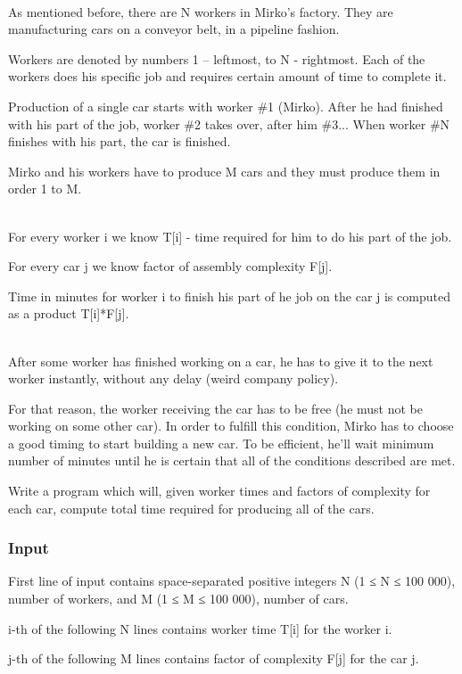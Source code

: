 

 

As mentioned before, there are N workers in Mirko's factory. They are manufacturing cars on a conveyor belt, in a pipeline fashion.

Workers are denoted by numbers 1 – leftmost, to N - rightmost. Each of the workers does his specific job and requires certain amount of time to complete it.

Production of a single car starts with worker \#1 (Mirko). After he had finished with his part of the job, worker \#2 takes over, after him \#3... When worker \#N finishes with his part, the car is finished.

Mirko and his workers have to produce M cars and they must produce them in order 1 to M.


\\For every worker i we know T[i] - time required for him to do his part of the job.

For every car j we know factor of assembly complexity F[j].

Time in minutes for worker i to finish his part of he job on the car j is computed as a product T[i]*F[j].


\\After some worker has finished working on a car, he has to give it to the next worker instantly, without any delay (weird company policy).

For that reason, the worker receiving the car has to be free (he must not be working on some other car). In order to fulfill this condition, Mirko has to choose a good timing to start building a new car. To be efficient, he’ll wait minimum number of minutes until he is certain that all of the conditions described are met.

Write a program which will, given worker times and factors of complexity for each car, compute total time required for producing all of the cars.

\subsubsection{Input}

First line of input contains space-separated positive integers N (1 ≤ N ≤ 100 000), number of workers, and M (1 ≤ M ≤ 100 000), number of cars.

i-th of the following N lines contains worker time T[i] for the worker i.

j-th of the following M lines contains factor of complexity F[j] for the car j.

